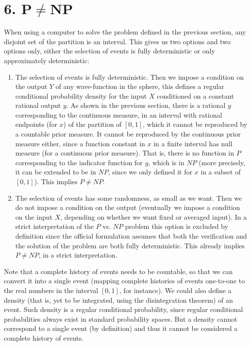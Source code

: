 \documentclass[11pt,a4paper]{report}
\begin{document}
\hypertarget{pneqnp}{%
\section{\texorpdfstring{6.
P\(\neq\)NP}{6. P\textbackslash neqNP}}\label{pneqnp}}

When using a computer to solve the problem defined in the previous
section, any disjoint set of the partition is an interval. This gives us
two options and two options only, either the selection of events is
fully deterministic or only approximately deterministic:

\begin{enumerate}
\item
  The selection of events is fully deterministic. Then we impose a
  condition on the output \(Y\) of any wave-function in the sphere, this
  defines a regular conditional probability density for the input \(X\)
  conditioned on a constant rational output \(y\). As shown in the
  previous section, there is a rational \(y\) corresponding to the
  continuous measure, in an interval with rational endpoints (for \(x\))
  of the partition of \([0,1]\), which it cannot be reproduced by a
  countable prior measure. It cannot be reproduced by the continuous
  prior measure either, since a function constant in \(x\) in a finite
  interval has null measure (for a continuous prior measure). That is,
  there is no function in \(P\) corresponding to the indicator function
  for \(y\), which is in \(NP\) (more precisely, it can be extended to
  be in \(NP\), since we only defined it for \(x\) in a subset of
  \([0,1]\)). This implies \(P\neq NP\).
\item
  The selection of events has some randomness, as small as we want. Then
  we do not impose a condition on the output (eventually we impose a
  condition on the input \(X\), depending on whether we want fixed or
  averaged input). In a strict interpretation of the \(P\) vs. \(NP\)
  problem this option is excluded by definition since the official
  formulation assumes that both the verification and the solution of the
  problem are both fully deterministic. This already implies
  \(P\neq NP\), in a strict interpretation.
\end{enumerate}

Note that a complete history of events needs to be countable, so that we
can convert it into a single event (mapping complete histories of events
one-to-one to the real numbers in the interval \([0,1]\), for instance).
We could also define a density (that is, yet to be integrated, using the
disintegration
theorem\cite{chang1997conditioning}) of an event. Such density is a regular conditional probability,
since regular conditional probabilities always exist in standard
probability
spaces\cite{durrett2019probability}.
But a density cannot correspond to a single event (by definition) and
thus it cannot be considered a complete history of events.
\end{document}
